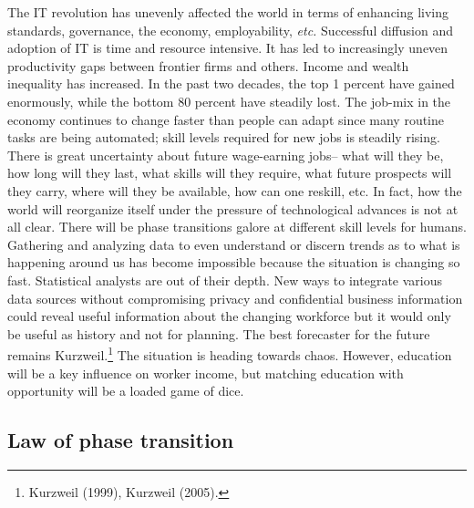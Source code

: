 \begin{multicols}{2}
The IT revolution has unevenly affected the world in terms of enhancing living standards, governance, the economy, employability, \textit{etc.} Successful diffusion and adoption of IT is time and resource intensive. It has led to increasingly uneven productivity gaps between frontier firms and others. Income and wealth inequality has increased. In the past two decades, the top 1 percent have gained enormously, while the bottom 80 percent have steadily lost. The job-mix in the economy continues to change faster than people can adapt since many routine tasks are being automated; skill levels required for new jobs is steadily rising. There is great uncertainty about future wage-earning jobs-- what will they be, how long will they last, what skills will they require, what future prospects will they carry, where will they be available, how can one reskill, etc. In fact, how the world will reorganize itself under the pressure of technological advances is not at all clear. There will be phase transitions galore at different skill levels for humans. Gathering and analyzing data to even understand or discern trends as to what is happening around us has become impossible because the situation is changing so fast. Statistical analysts are out of their depth. New ways to integrate various data sources without compromising privacy and confidential business information could reveal useful information about the changing workforce but it would only be useful as history and not for planning. The best forecaster for the future remains Kurzweil.\footnote{Kurzweil (1999), Kurzweil (2005).} The situation is heading towards chaos. However, education will be a key influence on worker income, but matching education with opportunity will be a loaded game of dice.

\subsection*{Law of phase transition}


\end{multicols}
